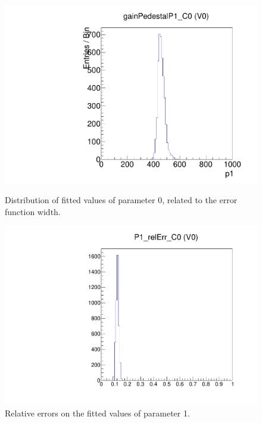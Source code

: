 \begin{figure}[!htp]
\centering
\begin{minipage}{0.45\textwidth}
  \includegraphics[width=1.0\textwidth]{figures/gainped_gainPedestalP1.pdf}
  \caption{Distribution of fitted values of parameter 0, related to the error function width.}
  \label{fig:gainped_gainPedestalP1}
\end{minipage}
\hspace{0.3cm}
\begin{minipage}{0.45\textwidth}
  \includegraphics[width=1.0\textwidth]{figures/gainped_P1_relErr.pdf}
  \caption{Relative errors on the fitted values of parameter 1.}
  \label{fig:gainped_P1_relErr}
\end{minipage}
\end{figure}

